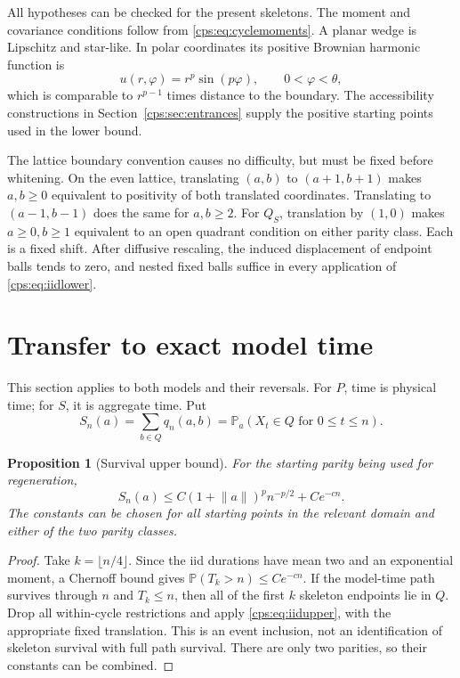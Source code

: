 \documentclass[11pt,letterpaper]{article}
\numberwithin{equation}{section}
\newtheorem{proposition}[theorem]{Proposition}
\theoremstyle{remark}\newtheorem{remark}[theorem]{Remark}
\newcommand{\PP}{\mathbb P}
\newcommand{\norm}[1]{\lVert#1\rVert}
\begin{document}
All hypotheses can be checked for the present skeletons. The moment and covariance conditions follow from \eqref{cps:eq:cyclemoments}. A planar wedge is Lipschitz and star-like. In polar coordinates its positive Brownian harmonic function is
\begin{equation}
 u(r,\varphi)=r^p\sin(p\varphi),\qquad0<\varphi<\theta,
\end{equation}
which is comparable to $r^{p-1}$ times distance to the boundary. The accessibility constructions in Section~\ref{cps:sec:entrances} supply the positive starting points used in the lower bound.

The lattice boundary convention causes no difficulty, but must be fixed before whitening. On the even lattice, translating $(a,b)$ to $(a+1,b+1)$ makes $a,b\ge0$ equivalent to positivity of both translated coordinates. Translating to $(a-1,b-1)$ does the same for $a,b\ge2$. For $Q_S$, translation by $(1,0)$ makes $a\ge0,b\ge1$ equivalent to an open quadrant condition on either parity class. Each is a fixed shift. After diffusive rescaling, the induced displacement of endpoint balls tends to zero, and nested fixed balls suffice in every application of \eqref{cps:eq:iidlower}.

\section{Transfer to exact model time}\label{cps:sec:time}
This section applies to both models and their reversals. For $P$, time is physical time; for $S$, it is aggregate time. Put
\begin{equation}
 S_n(a)=\sum_{b\in Q}q_n(a,b)=\PP_a(X_t\in Q\text{ for }0\le t\le n).
\end{equation}

\begin{proposition}[Survival upper bound]\label{cps:prop:survival}
For the starting parity being used for regeneration,
\begin{equation}\label{cps:eq:survival}
 S_n(a)\le C(1+\norm a)^p n^{-p/2}+Ce^{-cn}.
\end{equation}
The constants can be chosen for all starting points in the relevant domain and either of the two parity classes.
\end{proposition}
\begin{proof}
Take $k=\lfloor n/4\rfloor$. Since the iid durations have mean two and an exponential moment, a Chernoff bound gives $\PP(T_k>n)\le Ce^{-cn}$. If the model-time path survives through $n$ and $T_k\le n$, then all of the first $k$ skeleton endpoints lie in $Q$. Drop all within-cycle restrictions and apply \eqref{cps:eq:iidupper}, with the appropriate fixed translation. This is an event inclusion, not an identification of skeleton survival with full path survival. There are only two parities, so their constants can be combined.
\end{proof}
\end{document}
